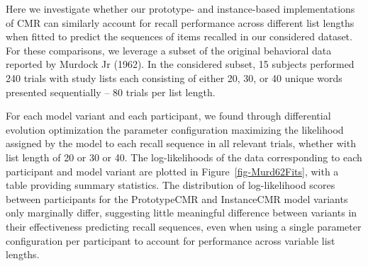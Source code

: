 \documentclass[
  letterpaper,
  DIV=11,
  numbers=noendperiod]{scrreport}
\begin{document}
Here we investigate whether our prototype- and instance-based
implementations of CMR can similarly account for recall performance
across different list lengths when fitted to predict the sequences of
items recalled in our considered dataset. For these comparisons, we
leverage a subset of the original behavioral data reported by Murdock Jr
(1962). In the considered subset, 15 subjects performed 240 trials with
study lists each consisting of either 20, 30, or 40 unique words
presented sequentially -- 80 trials per list length.

For each model variant and each participant, we found through
differential evolution optimization the parameter configuration
maximizing the likelihood assigned by the model to each recall sequence
in all relevant trials, whether with list length of 20 or 30 or 40. The
log-likelihoods of the data corresponding to each participant and model
variant are plotted in Figure~\ref{fig-Murd62Fits}, with a table
providing summary statistics. The distribution of log-likelihood scores
between participants for the PrototypeCMR and InstanceCMR model variants
only marginally differ, suggesting little meaningful difference between
variants in their effectiveness predicting recall sequences, even when
using a single parameter configuration per participant to account for
performance across variable list lengths.
\end{document}
